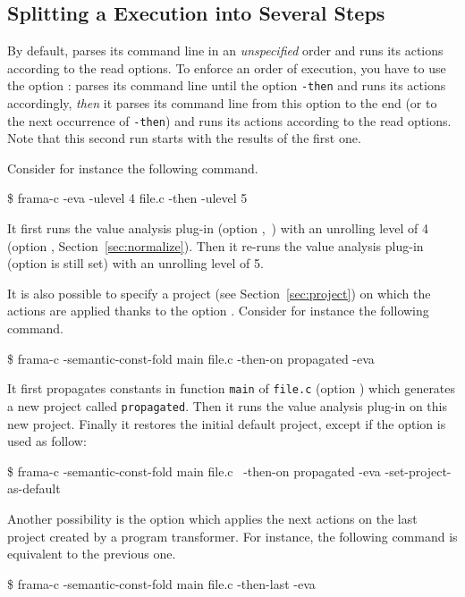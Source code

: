 \subsection{Splitting a \FramaC Execution into Several Steps}\label{sec:then}

By default, \FramaC parses its command line in an \emph{unspecified} order and
runs its actions according to the read options. To enforce an order of
execution, you have to use the option : \FramaC parses its
command line until the option \texttt{-then} and runs its actions accordingly,
\emph{then} it parses its command line from this option to the end (or to the
next occurrence of \texttt{-then}) and runs its actions according to the read
options. Note that this second run starts with the results of the first one.

Consider for instance the following command.
\begin{shell}
\$ frama-c -eva -ulevel 4 file.c -then -ulevel 5
\end{shell}
It first runs the value analysis plug-in (option
,~\cite{value}) with an unrolling level of 4 (option
, Section~\ref{sec:normalize}). Then it re-runs the value
analysis plug-in (option  is still set) with an unrolling
level of 5.

It is also possible to specify a project (see Section~\ref{sec:project}) on
which the actions are applied thanks to the option .
Consider for instance the following command.
\begin{shell}
\$ frama-c -semantic-const-fold main file.c -then-on propagated -eva
\end{shell}
It first propagates constants in function \texttt{main} of \texttt{file.c}
(option ) which generates a new project
called \texttt{propagated}. Then it runs the value analysis plug-in on this new
project. Finally it restores the initial default project, except if the option
 is used as follow:
\begin{shell}
\$ frama-c -semantic-const-fold main file.c \
          -then-on propagated -eva -set-project-as-default
\end{shell}

Another possibility is the option  which applies the
next actions on the last project created by a program transformer. For
instance, the following command is equivalent to the previous one.
\begin{shell}
\$ frama-c -semantic-const-fold main file.c -then-last -eva
\end{shell}

